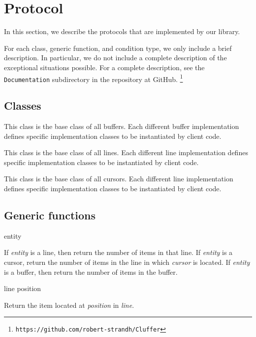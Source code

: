 \appendix

\section{Protocol}

In this section, we describe the protocols that are implemented by our
library.

For each class, generic function, and condition type, we only include
a brief description.  In particular, we do not include a complete
description of the exceptional situations possible.  For a complete
description, see the \texttt{Documentation} subdirectory in
the repository at GitHub.%
\footnote{\texttt{https://github.com/robert-strandh/Cluffer}}

\subsection{Classes}


\vskip 1mm\noindent
This class is the base class of all buffers.  Each different buffer
implementation defines specific implementation classes to be
instantiated by client code.


\vskip 1mm\noindent
This class is the base class of all lines.  Each different line
implementation defines specific implementation classes to be
instantiated by client code.


\vskip 1mm\noindent
This class is the base class of all cursors.  Each different line
implementation defines specific implementation classes to be
instantiated by client code.

\subsection{Generic functions}

 {entity}

\vskip 1mm\noindent
If \textit{entity} is a line, then return the number of items in that
line.  If \textit{entity} is a cursor, return the number of items in
the line in which \textit{cursor} is located.  If \textit{entity} is a
buffer, then return the number of items in the buffer.

 {line position}

\vskip 1mm\noindent
Return the item located at \textit{position} in \textit{line}.

